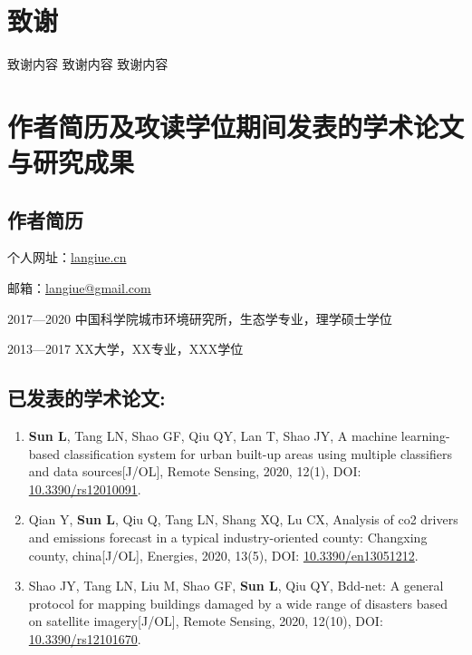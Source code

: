 
\chapter[致谢]{致\quad 谢}%

致谢内容
致谢内容
致谢内容

\chapter{作者简历及攻读学位期间发表的学术论文与研究成果}

\section*{作者简历}

个人网址：\href{https://langiue.cn}{langiue.cn}

邮箱：\href{mailto:langiue@gmail.com}{langiue@gmail.com}

2017—2020 \quad 中国科学院城市环境研究所，生态学专业，理学硕士学位

2013—2017 \quad XX大学，XX专业，XXX学位


\section*{已发表的学术论文:}

{
\setlist[enumerate]{}%
\begin{enumerate}[nosep]
    \item \textbf{Sun L}, Tang LN,  Shao GF, Qiu QY,  Lan T, Shao JY, A machine learning-based classification system for urban built-up areas using multiple classifiers and data sources[J/OL], Remote Sensing, 2020, 12(1), DOI: \href{https://doi.org/10.3390/rs12010091}{10.3390/rs12010091}.
    \item Qian Y, \textbf{Sun L}, Qiu Q, Tang LN, Shang XQ, Lu CX, Analysis of co2 drivers and emissions forecast in a typical industry-oriented county: Changxing county, china[J/OL], Energies, 2020, 13(5), DOI: \href{https://doi.org/10.3390/en13051212}{10.3390/en13051212}.
    \item Shao JY, Tang LN, Liu M, Shao GF, \textbf{Sun L}, Qiu QY, Bdd-net: A general protocol for mapping buildings damaged by a wide range of disasters based on satellite imagery[J/OL], Remote Sensing, 2020, 12(10), DOI: \href{https://doi.org/10.3390/rs12101670}{10.3390/rs12101670}.
\end{enumerate}
}

